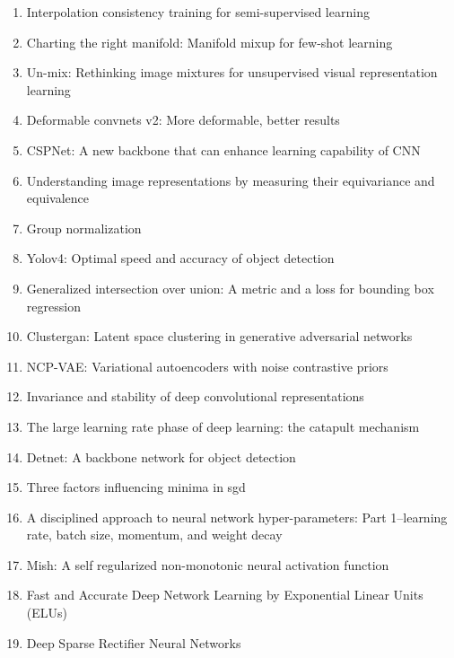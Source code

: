 \documentclass[acmlarge]{acmart}
\begin{document}
\begin{enumerate}
	\item Interpolation consistency training for semi-supervised learning \cite{verma2019interpolation}
	\item Charting the right manifold: Manifold mixup for few-shot learning \cite{mangla2020charting}
	\item Un-mix: Rethinking image mixtures for unsupervised visual representation learning \cite{shen2020mix}
	\item Deformable convnets v2: More deformable, better results \cite{zhu2019deformable}
	\item CSPNet: A new backbone that can enhance learning capability of CNN \cite{wang2020cspnet}
	\item Understanding image representations by measuring their equivariance and equivalence \cite{lenc2015understanding}
	\item Group normalization \cite{wu2018group}
	\item Yolov4: Optimal speed and accuracy of object detection \cite{bochkovskiy2020yolov4}
	\item Generalized intersection over union: A metric and a loss for bounding box regression \cite{rezatofighi2019generalized}
	\item Clustergan: Latent space clustering in generative adversarial networks \cite{mukherjee2019clustergan}
	\item NCP-VAE: Variational autoencoders with noise contrastive priors \cite{aneja2020ncp}
	\item Invariance and stability of deep convolutional representations \cite{bietti2017invariance}
	\item The large learning rate phase of deep learning: the catapult mechanism \cite{lewkowycz2020large}
	\item Detnet: A backbone network for object detection \cite{li2018detnet}
	\item Three factors influencing minima in sgd \cite{jastrzkebski2017three}
	\item A disciplined approach to neural network hyper-parameters: Part 1--learning rate, batch size, momentum, and weight decay \cite{smith2018disciplined}
	\item Mish: A self regularized non-monotonic neural activation function \cite{misra2019mish}
	\item Fast and Accurate Deep Network Learning by Exponential Linear Units (ELUs) \cite{clevert2015fast}
	\item Deep Sparse Rectifier Neural Networks \cite{pmlr-v15-glorot11a}

\end{enumerate}
\end{document}
